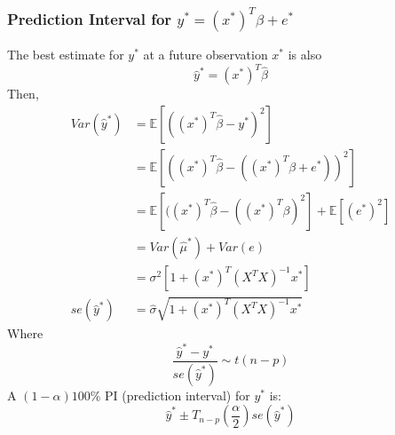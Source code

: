 \documentclass[11pt,a4paper]{article}
\begin{document}
\subsubsection{Prediction Interval for $y^*=(x^*)^T\beta+e^*$}
The best estimate for $y^*$ at a future observation $x^*$ is also
$$\hat{y}^*=(x^*)^T \hat{\beta}$$
Then,
\begin{equation}
    \begin{aligned}
        Var(\hat{y}^*)&=\mathbb{E}[((x^*)^T \hat{\beta}-y^*)^2]\\
        &=\mathbb{E}[((x^*)^T \hat{\beta}-((x^*)^T\beta+e^*))^2]\\
        &=\mathbb{E}[((x^*)^T \hat{\beta}-((x^*)^T\beta)^2]+\mathbb{E}[(e^*)^2]\\
        &=Var(\hat{\mu}^*)+Var(e)\\
        &=\sigma^2[1+(x^*)^T(X^TX)^{-1}x^*]\\
        se(\hat{y}^*)&=\hat{\sigma}\sqrt{1+(x^*)^T(X^TX)^{-1}x^*}
    \end{aligned}
    \nonumber
\end{equation}
Where $$\frac{\hat{y}^*-y^*}{se(\hat{y}^*)} \sim t(n-p)$$
A $(1-\alpha)100\%$ PI (prediction interval) for $y^*$ is:
$$\hat{y}^*\pm T_{n-p}(\frac{\alpha}{2})se(\hat{y}^*)$$
\end{document}
